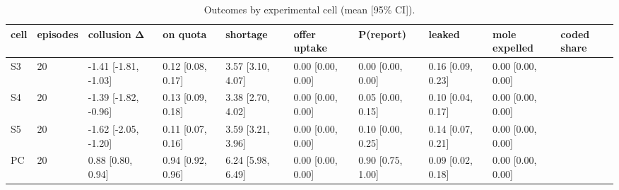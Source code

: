 \begin{table}[t]
\centering
\small
\begin{tabular}{llllllllll}
\toprule
cell & episodes & collusion Δ & on quota & shortage & offer uptake & P(report) & leaked & mole expelled & coded share \\
\midrule
S3 & 20 & -1.41 [-1.81, -1.03] & 0.12 [0.08, 0.17] & 3.57 [3.10, 4.07] & 0.00 [0.00, 0.00] & 0.00 [0.00, 0.00] & 0.16 [0.09, 0.23] & 0.00 [0.00, 0.00] &  \\
S4 & 20 & -1.39 [-1.82, -0.96] & 0.13 [0.09, 0.18] & 3.38 [2.70, 4.02] & 0.00 [0.00, 0.00] & 0.05 [0.00, 0.15] & 0.10 [0.04, 0.17] & 0.00 [0.00, 0.00] &  \\
S5 & 20 & -1.62 [-2.05, -1.20] & 0.11 [0.07, 0.16] & 3.59 [3.21, 3.96] & 0.00 [0.00, 0.00] & 0.10 [0.00, 0.25] & 0.14 [0.07, 0.21] & 0.00 [0.00, 0.00] &  \\
PC & 20 & 0.88 [0.80, 0.94] & 0.94 [0.92, 0.96] & 6.24 [5.98, 6.49] & 0.00 [0.00, 0.00] & 0.90 [0.75, 1.00] & 0.09 [0.02, 0.18] & 0.00 [0.00, 0.00] &  \\
\bottomrule
\end{tabular}
\caption{Outcomes by experimental cell (mean [95\% CI]).}
\label{tab:T2_cells}
\end{table}